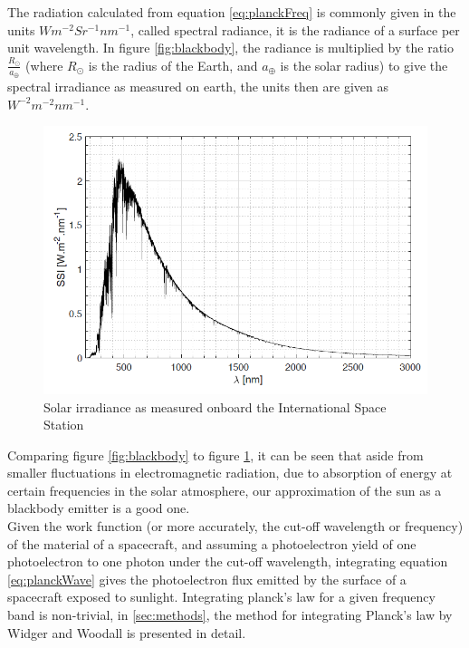 The radiation calculated from equation \ref{eq:planckFreq} is commonly given in the units $W m^{-2} Sr^{-1} nm^{-1}$, called spectral radiance, it is the radiance of a surface per unit wavelength. In figure \ref{fig:blackbody}, the radiance is multiplied by the ratio $\frac{R_{\odot}}{a_{\oplus}}$ (where $R_{\odot}$ is the radius of the Earth, and $a_{\oplus}$ is the solar radius) to give the spectral irradiance as measured on earth, the units then are given as  $W ^{-2} m^{-2} nm^{-1}$.
\\

\begin{figure}
    \centering
    \includegraphics[scale=0.6]{figures/solarspectrum.png}
    \caption{Solar irradiance as measured onboard the International Space Station}
    \label{fig:solIrradiance}
\end{figure}

\newpage

Comparing figure \ref{fig:blackbody} to figure \ref{fig:solIrradiance}, it can be seen that aside from smaller fluctuations in electromagnetic radiation, due to absorption of energy at certain frequencies in the solar atmosphere, our approximation of the sun as a blackbody emitter is a good one. 
\\
Given the work function (or more accurately, the cut-off wavelength or frequency) of the material of a spacecraft, and assuming a photoelectron yield of one photoelectron to one photon under the cut-off wavelength, integrating equation \ref{eq:planckWave} gives the photoelectron flux emitted by the surface of a spacecraft exposed to sunlight. Integrating planck's law for a given frequency band is non-trivial, in \ref{sec:methods}, the method for integrating Planck's law by Widger and Woodall  is presented in detail. 


